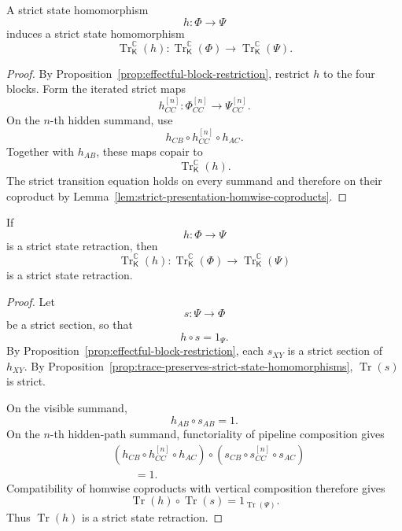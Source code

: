\begin{proposition}
\label{prop:trace-preserves-strict-state-homomorphisms}
A strict state homomorphism
\[
    h:\Phi\longrightarrow\Psi
\]
induces a strict state homomorphism
\[
    \operatorname{Tr}^{\mathbb C}_{\mathsf K}(h):
    \operatorname{Tr}^{\mathbb C}_{\mathsf K}(\Phi)
    \longrightarrow
    \operatorname{Tr}^{\mathbb C}_{\mathsf K}(\Psi).
\]
\end{proposition}

\begin{proof}
By Proposition~\ref{prop:effectful-block-restriction}, restrict \(h\) to the
four blocks.  Form the iterated strict maps
\[
    h_{CC}^{[n]}:
    \Phi_{CC}^{[n]}
    \longrightarrow
    \Psi_{CC}^{[n]}.
\]
On the \(n\)-th hidden summand, use
\[
    h_{CB}
    \circ
    h_{CC}^{[n]}
    \circ
    h_{AC}.
\]
Together with \(h_{AB}\), these maps copair to
\[
    \operatorname{Tr}^{\mathbb C}_{\mathsf K}(h).
\]
The strict transition equation holds on every summand and therefore on their
coproduct by
Lemma~\ref{lem:strict-presentation-homwise-coproducts}.
\end{proof}

\begin{proposition}
\label{prop:trace-preserves-strict-state-retractions}
If
\[
    h:\Phi\longrightarrow\Psi
\]
is a strict state retraction, then
\[
    \operatorname{Tr}^{\mathbb C}_{\mathsf K}(h):
    \operatorname{Tr}^{\mathbb C}_{\mathsf K}(\Phi)
    \longrightarrow
    \operatorname{Tr}^{\mathbb C}_{\mathsf K}(\Psi)
\]
is a strict state retraction.
\end{proposition}

\begin{proof}
Let
\[
    s:\Psi\longrightarrow\Phi
\]
be a strict section, so that
\[
    h\circ s=1_\Psi.
\]
By Proposition~\ref{prop:effectful-block-restriction}, each \(s_{XY}\) is a
strict section of \(h_{XY}\).  By
Proposition~\ref{prop:trace-preserves-strict-state-homomorphisms},
\(\operatorname{Tr}(s)\) is strict.

On the visible summand,
\[
    h_{AB}\circ s_{AB}=1.
\]
On the \(n\)-th hidden-path summand, functoriality of pipeline composition
gives
\[
\begin{aligned}
&
\left(
    h_{CB}\circ h_{CC}^{[n]}\circ h_{AC}
\right)
\circ
\left(
    s_{CB}\circ s_{CC}^{[n]}\circ s_{AC}
\right)
\\
&\qquad=
1.
\end{aligned}
\]
Compatibility of homwise coproducts with vertical composition therefore
gives
\[
    \operatorname{Tr}(h)
    \circ
    \operatorname{Tr}(s)
    =
    1_{\operatorname{Tr}(\Psi)}.
\]
Thus \(\operatorname{Tr}(h)\) is a strict state retraction.
\end{proof}

